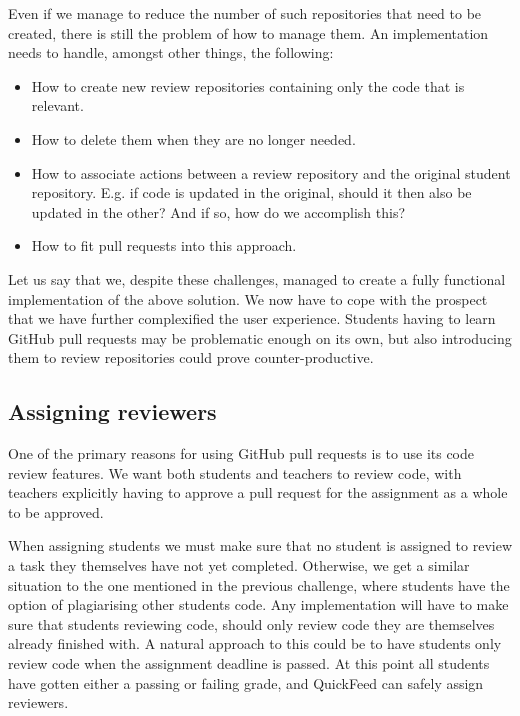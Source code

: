 Even if we manage to reduce the number of such repositories that need to be created, there is still the problem of how to manage them.
An implementation needs to handle, amongst other things, the following:

\begin{itemize}
    \item How to create new review repositories containing only the code that is relevant.
    \item How to delete them when they are no longer needed.
    \item How to associate actions between a review repository and the original student repository.
          E.g. if code is updated in the original, should it then also be updated in the other?
          And if so, how do we accomplish this?
    \item How to fit pull requests into this approach.
\end{itemize}

Let us say that we, despite these challenges, managed to create a fully functional implementation of the above solution.
We now have to cope with the prospect that we have further complexified the user experience.
Students having to learn GitHub pull requests may be problematic enough on its own, but also introducing them to review repositories could prove counter-productive.

\subsection{Assigning reviewers}

One of the primary reasons for using GitHub pull requests is to use its code review features.
We want both students and teachers to review code, with teachers explicitly having to approve a pull request for the assignment as a whole to be approved.

When assigning students we must make sure that no student is assigned to review a task they themselves have not yet completed.
Otherwise, we get a similar situation to the one mentioned in the previous challenge, where students have the option of plagiarising other students code.
Any implementation will have to make sure that students reviewing code, should only review code they are themselves already finished with.
A natural approach to this could be to have students only review code when the assignment deadline is passed.
At this point all students have gotten either a passing or failing grade, and QuickFeed can safely assign reviewers.

